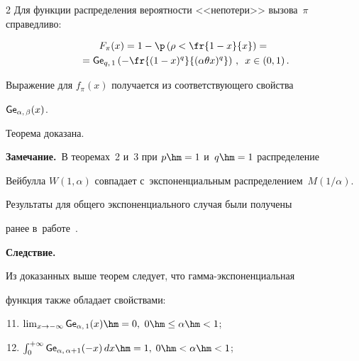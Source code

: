 \begin{multicols}{2}
Для функции распределения вероятности <<непотери>> вызова~$\pi$ справедливо:


\begin{multline*}


F_\pi(x) = 1 - \p\left(\rho<


\fr{{1-x}}{{x}}\right)={}\\


{}= \G_{q,\, 1}\left(-\fr{(1-x)^q}{(\alpha \theta x)^q}\right)\,, \enskip


x\in(0,1)\,.


\end{multline*}


Выражение для $f_\pi(x)$ получается из соответст\-ву\-юще\-го свойства 


${\sf Ge}_{\alpha,\, \beta} (x)$.





Теорема доказана.





\smallskip





\noindent


\textbf{Замечание.}\ В теоремах~2 и~3 при $p\hm = 1$ и~$q \hm= 1$ распределение 


Вейбулла $W(1, \alpha)$ совпадает с~экспоненциальным распределением~$M(1/\alpha)$. 


Результаты для общего экспоненциального случая были получены 


ранее в~работе~\cite{KuSh09b}.





\smallskip





\noindent


\textbf{Следствие.}\


Из доказанных выше теорем следует, что гам\-ма-экс\-по\-нен\-ци\-аль\-ная


 функция также обладает свойствами:


\begin{enumerate}


\setcounter{enumi}{10}


\item $\lim\nolimits_{x\to-\infty} \G_{\alpha,\, 1}(x) \hm= 0,$ $0\hm\leq \alpha\hm<1$;


\item $\int\nolimits_{0}^{+\infty} \G_{\alpha,\, \alpha + 1}(-x)\,dx \hm= 1,$ $0\hm<\alpha\hm<1$;



\end{enumerate}
\end{multicols}
